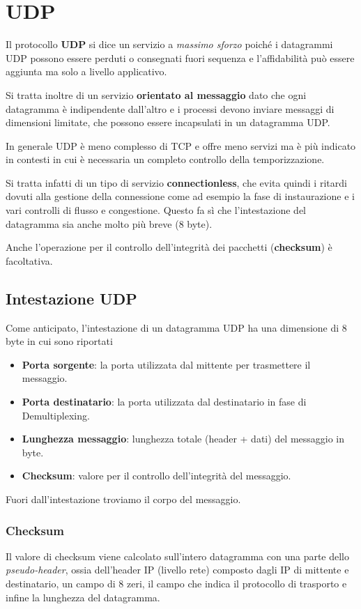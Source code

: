 \section{UDP}
Il protocollo \textbf{UDP} si dice un servizio a \emph{massimo sforzo} poiché i datagrammi UDP
possono essere perduti o consegnati fuori sequenza e l'affidabilità può essere aggiunta ma solo a 
livello applicativo.

Si tratta inoltre di un servizio \textbf{orientato al messaggio} dato che ogni datagramma è 
indipendente dall'altro e i processi devono inviare messaggi di dimensioni limitate, che possono
essere incapsulati in un datagramma UDP.

In generale UDP è meno complesso di TCP e offre meno servizi ma è più indicato in contesti in cui
è necessaria un completo controllo della temporizzazione.

Si tratta infatti di un tipo di servizio \textbf{connectionless}, che evita quindi i ritardi 
dovuti alla gestione della connessione come ad esempio la fase di instaurazione e i vari controlli
di flusso e congestione. Questo fa sì che l'intestazione del datagramma sia anche molto più breve
(8 byte).

Anche l'operazione per il controllo dell'integrità dei pacchetti (\textbf{checksum}) è 
facoltativa.

\subsection{Intestazione UDP}
Come anticipato, l'intestazione di un datagramma UDP ha una dimensione di 8 byte in cui sono
riportati
\begin{itemize}
	\item \textbf{Porta sorgente}: la porta utilizzata dal mittente per trasmettere il messaggio.
	\item \textbf{Porta destinatario}: la porta utilizzata dal destinatario in fase di 
		Demultiplexing.
	\item \textbf{Lunghezza messaggio}: lunghezza totale (header + dati) del messaggio in byte.
	\item \textbf{Checksum}: valore per il controllo dell'integrità del messaggio.
\end{itemize}
Fuori dall'intestazione troviamo il corpo del messaggio.

\subsubsection{Checksum}
Il valore di checksum viene calcolato sull'intero datagramma con una parte dello 
\emph{pseudo-header}, ossia dell'header IP (livello rete) composto dagli IP di mittente e 
destinatario, un campo di 8 zeri, il campo che indica il protocollo di trasporto e infine la 
lunghezza del datagramma.

